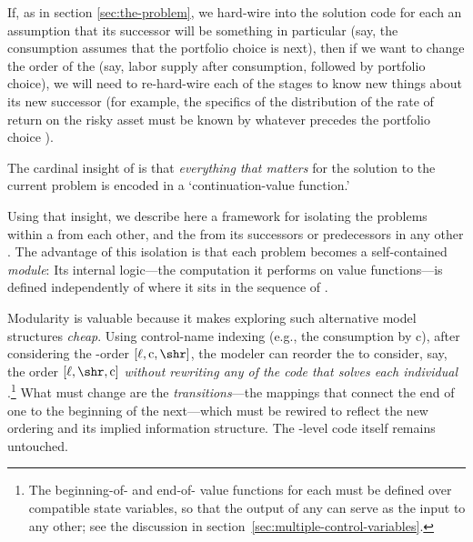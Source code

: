 \documentclass[titlepage, headings=optiontotocandhead]{econark}
\begin{document}
If, as in section \ref{sec:the-problem}, we hard-wire into the solution code for each {\stg} an assumption that its successor {\stg} will be something in particular (say, the consumption {\stg} assumes that the portfolio choice is next), then if we want to change the order of the {\stgs} (say, labor supply after consumption, followed by portfolio choice), we will need to re-hard-wire each of the stages to know new things about its new successor (for example, the specifics of the distribution of the rate of return on the risky asset must be known by whatever {\stg} precedes the portfolio choice {\stg}).

The cardinal insight of \citet{bellman1957} is that \emph{everything that matters} for the solution to the current problem is encoded in a `continuation-value function.'

Using that insight, we describe here a framework for isolating the {\stg} problems within a {\interval} from each other, and the {\interval} from its successors or predecessors in any other {\interval}.  The advantage of this isolation is that each {\stg} problem becomes a self-contained \textit{module}: Its internal logic---the computation it performs on value functions---is defined independently of where it sits in the sequence of {\stgs}.


Modularity is valuable because it makes exploring such alternative model structures \textit{cheap}.  Using control-name indexing (e.g., the consumption {\stg} by $\mathrm{c}$), after considering the {\stg}-order $[\ell,\mathrm{c},\shr]$, the modeler can reorder the {\stgs} to consider, say, the order $[\ell,\shr,\mathrm{c}]$ \textit{without rewriting any of the code that solves each individual {\stg}}.\footnote{The beginning-of-{\stg} and end-of-{\stg} value functions for each {\stg} must be defined over compatible state variables, so that the output of any {\stg} can serve as the input to any other; see the discussion in section~\ref{sec:multiple-control-variables}.
}  What must change are the \textit{transitions}---the mappings that connect the end of one {\stg} to the beginning of the next---which must be rewired to reflect the new ordering and its implied information structure.  The {\stg}-level code itself remains untouched.
\end{document}
